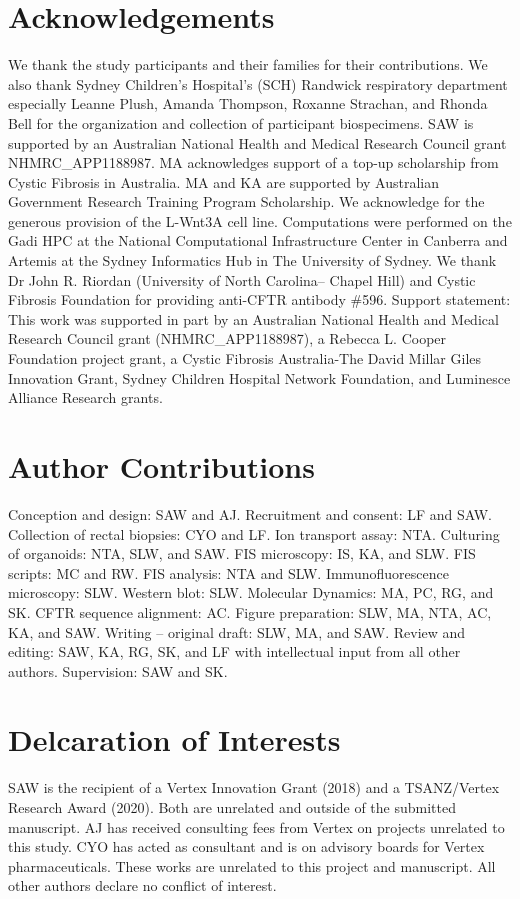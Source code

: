 \section{Acknowledgements}
We thank the study participants and their families for their contributions. We also thank Sydney Children's Hospital's (SCH) Randwick respiratory department especially Leanne Plush, Amanda Thompson, Roxanne Strachan, and Rhonda Bell for the organization and collection of participant biospecimens. SAW is supported by an Australian National Health and Medical Research Council grant NHMRC\_APP1188987. MA acknowledges support of a top-up scholarship from Cystic Fibrosis in Australia. MA and KA are supported by Australian Government Research Training Program Scholarship. We acknowledge for the generous provision of the L-Wnt3A cell line. Computations were performed on the Gadi HPC at the National Computational Infrastructure Center in Canberra and Artemis at the Sydney Informatics Hub in The University of Sydney. We thank Dr John R. Riordan (University of North Carolina– Chapel Hill) and Cystic Fibrosis Foundation for providing anti-CFTR antibody \#596. Support statement: This work was supported in part by an Australian National Health and Medical Research Council grant (NHMRC\_APP1188987), a Rebecca L. Cooper Foundation project grant, a Cystic Fibrosis Australia-The David Millar Giles Innovation Grant, Sydney Children Hospital Network Foundation, and Luminesce Alliance Research grants.

\section{Author Contributions}
Conception and design: SAW and AJ. Recruitment and consent: LF and SAW. Collection of rectal biopsies: CYO and LF. Ion transport assay: NTA. Culturing of organoids: NTA, SLW, and SAW. FIS microscopy: IS, KA, and SLW. FIS scripts: MC and RW. FIS analysis: NTA and SLW. Immunofluorescence microscopy: SLW. Western blot: SLW. Molecular Dynamics: MA, PC, RG, and SK. CFTR sequence alignment: AC. Figure preparation: SLW, MA, NTA, AC, KA, and SAW. Writing – original draft: SLW, MA, and SAW. Review and editing: SAW, KA, RG, SK, and LF with intellectual input from all other authors. Supervision: SAW and SK.

\section{Delcaration of Interests}
SAW is the recipient of a Vertex Innovation Grant (2018) and a TSANZ/Vertex Research Award (2020). Both are unrelated and outside of the submitted manuscript. AJ has received consulting fees from Vertex on projects unrelated to this study. CYO has acted as consultant and is on advisory boards for Vertex pharmaceuticals. These works are unrelated to this project and manuscript. All other authors declare no conflict of interest.
